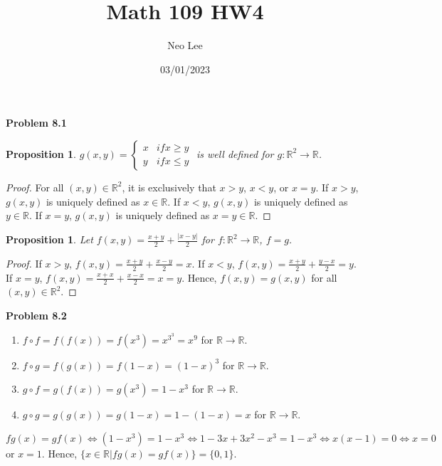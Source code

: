 \documentclass{article}
\title{Math 109 HW4}
\author{Neo Lee}
\date{03/01/2023}
\newtheorem{prop}[thm]{Proposition}
\begin{document}
 

\maketitle 
\textbf{Problem 8.1}
\begin{prop}
    $g(x,y)=\begin{cases}
        x & if x \ge y \\
        y & if x \le y
    \end{cases}$ is well defined for $g:\mathbb{R}^2\rightarrow\mathbb{R}$.
\end{prop}
\begin{proof}
    For all $(x,y) \in \mathbb{R}^2$, it is exclusively that $x>y$, $x<y$, or $x=y$. 
    If $x>y$, $g(x,y)$ is uniquely defined as $x \in \mathbb{R}$.
    If $x<y$, $g(x,y)$ is uniquely defined as $y \in \mathbb{R}$.
    If $x=y$, $g(x,y)$ is uniquely defined as $x=y \in \mathbb{R}$.
\end{proof}
\begin{prop}
    Let $f(x,y)=\frac{x+y}{2}+\frac{|x-y|}{2}$ for $f:\mathbb{R}^2\rightarrow\mathbb{R}$, $f=g$.
\end{prop}
\begin{proof}
    If $x>y$, $f(x,y)=\frac{x+y}{2}+\frac{x-y}{2}=x$.
    If $x<y$, $f(x,y)=\frac{x+y}{2}+\frac{y-x}{2}=y$.
    If $x=y$, $f(x,y)=\frac{x+x}{2}+\frac{x-x}{2}=x=y$.
    Hence, $f(x,y)=g(x,y)$ for all $(x,y)\in \mathbb{R}^2$.
\end{proof}
\bigbreak

\textbf{Problem 8.2}
\begin{enumerate}[label={(\roman*)}]
    \item $f\circ f=f(f(x))=f(x^3)=x^{3^3}=x^9$ for $\mathbb{R}\rightarrow\mathbb{R}$.
    \item $f\circ g=f(g(x))=f(1-x)=(1-x)^3$ for $\mathbb{R}\rightarrow\mathbb{R}$.
    \item $g\circ f=g(f(x))=g(x^3)=1-x^3$ for $\mathbb{R}\rightarrow\mathbb{R}$.
    \item $g\circ g=g(g(x))=g(1-x)=1-(1-x)=x$ for $\mathbb{R}\rightarrow\mathbb{R}$.
\end{enumerate}

$fg(x)=gf(x)\Leftrightarrow(1-x^3)=1-x^3\Leftrightarrow 1-3x+3x^2-x^3=1-x^3\Leftrightarrow x(x-1)=0\Leftrightarrow x=0$ or $x=1$. 
Hence, $\{x\in\mathbb{R}|fg(x)=gf(x)\}=\{0,1\}$.
\bigbreak
\end{document}
